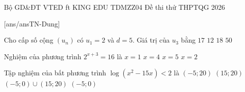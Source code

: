 \def\linkdethi{} %
\anmaQR
\def\toanlop{12}
\def\thoigian{90}
\def\namhoc{2025 - 2026}
\begin{dethi}
	{Bộ GD\&ĐT}
	{VTED ft KING EDU}
	{TDMZZ04}
	{Đề thi thử THPTQG 2026}
\end{dethi}
\caulc
{}[ans/ansTN-Dung]
\begin{ex}%
	Cho cấp số cộng $(u_n)$ có $u_1=2$ và $d=5$. Giá trị của $u_3$ bằng
	\choice
	{$17$}
	{\True $12$}
	{$18$}
	{$50$}
\end{ex}

\begin{ex}%
	Nghiệm của phương trình $2^{x+3} = 16$ là
	\choice
	{\True $x = 1$}
	{$x = 4$}
	{$x = 5$}
	{$x = 2$}
\end{ex}

\begin{ex}%
	Tập nghiệm của bất phương trình $\log\left(x^2-15x\right)<2$ là
	\choice
	{$(-5;20)$}
	{$(15;20)$}
	{\True $(-5;0)\cup(15;20)$}
	{$(-5;0)$}
\end{ex}


